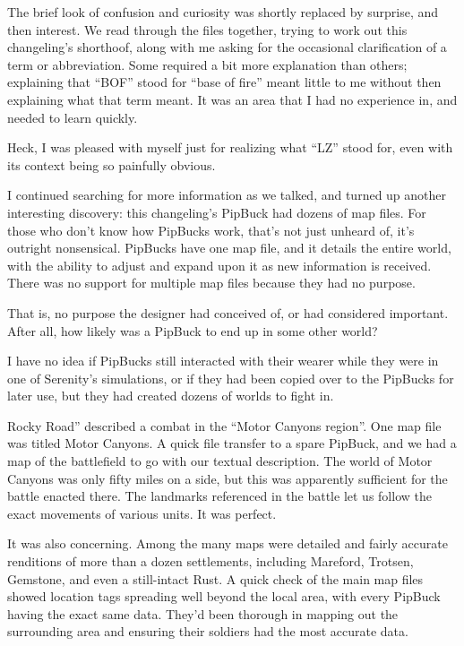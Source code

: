 The brief look of confusion and curiosity was shortly replaced by surprise, and then interest. We read through the files together, trying to work out this changeling’s shorthoof, along with me asking for the occasional clarification of a term or abbreviation. Some required a bit more explanation than others; explaining that “BOF” stood for “base of fire” meant little to me without then explaining what that term meant. It was an area that I had no experience in, and needed to learn quickly.

Heck, I was pleased with myself just for realizing what “LZ” stood for, even with its context being so painfully obvious.

I continued searching for more information as we talked, and turned up another interesting discovery: this changeling’s PipBuck had dozens of map files. For those who don’t know how PipBucks work, that’s not just unheard of, it’s outright nonsensical. PipBucks have one map file, and it details the entire world, with the ability to adjust and expand upon it as new information is received. There was no support for multiple map files because they had no purpose.

That is, no purpose the designer had conceived of, or had considered important. After all, how likely was a PipBuck to end up in some other world?

I have no idea if PipBucks still interacted with their wearer while they were in one of Serenity’s simulations, or if they had been copied over to the PipBucks for later use, but they had created dozens of worlds to fight in.

\leavevmode{}Rocky Road” described a combat in the “Motor Canyons region”. One map file was titled Motor Canyons. A quick file transfer to a spare PipBuck, and we had a map of the battlefield to go with our textual description. The world of Motor Canyons was only fifty miles on a side, but this was apparently sufficient for the battle enacted there. The landmarks referenced in the battle let us follow the exact movements of various units. It was perfect.

It was also concerning. Among the many maps were detailed and fairly accurate renditions of more than a dozen settlements, including Mareford, Trotsen, Gemstone, and even a still-intact Rust. A quick check of the main map files showed location tags spreading well beyond the local area, with every PipBuck having the exact same data. They’d been thorough in mapping out the surrounding area and ensuring their soldiers had the most accurate data.

